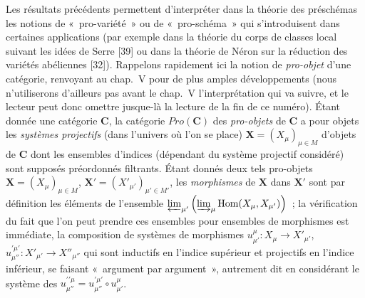 \begin{env}[8.13.3]
\label{IV.8.13.3-fr}
Les résultats précédents permettent d'interpréter dans la théorie des
préschémas les notions de «~pro-variété~» ou de «~pro-schéma~» qui
s'introduisent dans certaines applications (par exemple dans la théorie du
corps de classes local suivant les idées de Serre [39] ou dans la théorie de
Néron sur la réduction des variétés
abéliennes [32]). Rappelons rapidement ici la notion de \emph{pro-objet} d'une
catégorie, renvoyant au chap.~V pour de plus amples développements (nous
n'utiliserons d'ailleurs pas avant le chap.~V l'interprétation qui va suivre,
et le lecteur peut donc omettre jusque-là la lecture de la fin de ce numéro).
Étant donnée une catégorie $\boldsymbol{C}$, la catégorie
$\boldsymbol{\mathit{Pro}}(\boldsymbol{C})$ des \emph{pro-objets} de $\boldsymbol{C}$ a pour objets
les \emph{systèmes projectifs} (dans l'univers où l'on se place)
$\mathbf X=(X_\mu)_{\mu\in M}$ d'objets de $\boldsymbol{C}$ dont les ensembles
d'indices (dépendant du système projectif considéré) sont supposés préordonnés
filtrants. Étant donnés deux tels pro-objets
$\mathbf X=(X_\mu)_{\mu\in M}$,
$\mathbf X'=(X'_{\mu'})_{\mu'\in M'}$, les \emph{morphismes} de $\mathbf X$
dans $\mathbf X'$ sont par définition les éléments de l'ensemble
$\varprojlim_{\mu'}\left(\varinjlim_\mu
\operatorname{Hom}(X_\mu,X_{\mu'})\right)$~;
la vérification du fait que l'on peut prendre ces ensembles pour ensembles de
morphismes est immédiate, la composition de systèmes de morphismes
$u_{\mu'}^\mu:X_\mu\to X'_{\mu'}$,
$u_{\mu''}^{\prime\mu'}:X'_{\mu'}\to X''_{\mu''}$ qui sont inductifs en
l'indice supérieur et projectifs en l'indice inférieur, se faisant
«~argument par argument~», autrement dit en considérant le système des
$u_{\mu''}^{\prime\prime\mu}=u_{\mu''}^{\prime\mu'}\circ u_{\mu'}^\mu$.
\end{env}

